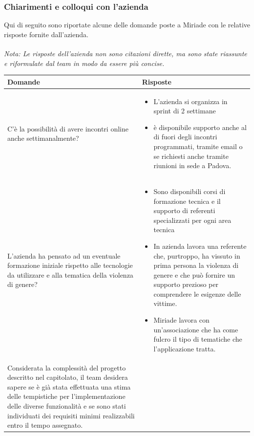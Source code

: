 \documentclass[a4paper,11pt]{article}
\begin{document}
\subsubsection{Chiarimenti e colloqui con l'azienda}
Qui di seguito sono riportate alcune delle domande poste a Miriade con le relative risposte fornite dall'azienda. 

\paragraph{}
\begin{center}
\small\textit{Nota: Le risposte dell'azienda non sono citazioni dirette, ma sono state riassunte e riformulate dal team in modo da essere più concise.}
\end{center}

{\footnotesize
\begin{tabularx}{\textwidth}{|>{\raggedright\arraybackslash}X|>{\raggedright\arraybackslash}X|}
\hline
\textbf{Domande} & \textbf{Risposte} \\
\hline
C'è la possibilità di avere incontri online anche settimanalmente?
&
\begin{itemize}
 \item L'azienda si organizza in sprint di 2 settimane
 \item è disponibile supporto anche al di fuori degli incontri programmati, tramite email o se richiesti anche tramite riunioni in sede a Padova.
\end{itemize}
\\
\hline
L'azienda ha pensato ad un eventuale formazione iniziale rispetto alle tecnologie da utilizzare e alla tematica della violenza di genere?
&
\begin{itemize}
 \item Sono disponibili corsi di formazione tecnica e il supporto di referenti specializzati per ogni area tecnica
 \item In azienda lavora una referente che, purtroppo, ha vissuto in prima persona la violenza di genere e che può fornire un supporto prezioso per comprendere le esigenze delle vittime.
 \item Miriade lavora con un'associazione che ha come fulcro il tipo di tematiche che l'applicazione tratta. 
\end{itemize}\\
\hline
Considerata la complessità del progetto descritto nel capitolato, il team desidera sapere se è già stata effettuata una stima delle tempistiche per l'implementazione delle diverse funzionalità e se sono stati individuati dei requisiti minimi realizzabili entro il tempo assegnato.

\end{tabularx}}
\end{document}
